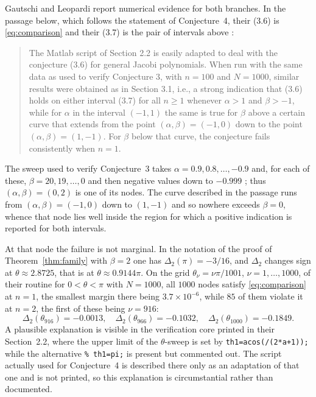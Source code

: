 \documentclass[11pt]{amsart}
\theoremstyle{remark}
\begin{document}
Gautschi and Leopardi report numerical evidence for both branches. In
the passage below, which follows the statement of Conjecture~4, their
(3.6) is \eqref{eq:comparison} and their (3.7) is the pair of intervals
above \cite[Section~3.2]{GautschiLeopardi}:
\begin{quote}
The Matlab script of Section 2.2 is easily adapted to deal with the
conjecture (3.6) for general Jacobi polynomials. When run with the
same data as used to verify Conjecture 3, with $n=100$ and $N=1000$,
similar results were obtained as in Section 3.1, i.e., a strong
indication that (3.6) holds on either interval (3.7) for all
$n\ge1$ whenever $\alpha>1$ and $\beta>-1$, while for $\alpha$ in the
interval $(-1,1)$ the same is true for $\beta$ above a certain curve
that extends from the point $(\alpha,\beta)=(-1,0)$ down to the point
$(\alpha,\beta)=(1,-1)$. For $\beta$ below that curve, the conjecture
fails consistently when $n=1$.
\end{quote}
The sweep used to verify Conjecture~3 takes
$\alpha=0.9,0.8,\dots,-0.9$ and, for each of these, $\beta=20,19,
\dots,0$ and then negative values down to $-0.999$
\cite[Section~3.1]{GautschiLeopardi}; thus $(\alpha,\beta)=(0,2)$ is
one of its nodes. The curve described in the passage runs from
$(\alpha,\beta)=(-1,0)$ down to $(1,-1)$ and so nowhere exceeds
$\beta=0$, whence that node lies well inside the region for which a positive
indication is reported for both intervals.

At that node the failure is not marginal. In the notation of the proof
of Theorem~\ref{thm:family} with $\beta=2$ one has
$\Delta_2(\pi)=-3/16$, and $\Delta_2$ changes sign at
$\theta\approx2.8725$, that is at $\theta\approx0.9144\pi$. On the
grid $\theta_\nu=\nu\pi/1001$, $\nu=1,\dots,1000$, of their routine
for $0<\theta<\pi$ with $N=1000$, all $1000$ nodes satisfy
\eqref{eq:comparison} at $n=1$, the smallest margin there being
$3.7\times10^{-6}$, while $85$ of them violate it at
$n=2$, the first of these being $\nu=916$:
\[
\Delta_2(\theta_{916})=-0.0013,\quad
\Delta_2(\theta_{966})=-0.1032,\quad
\Delta_2(\theta_{1000})=-0.1849.
\]
A plausible explanation is
visible in the verification core printed in their Section~2.2, where
the upper limit of the $\theta$-sweep is set by
\texttt{th1=\allowbreak acos(/\allowbreak(2*a+1));} while
the alternative
\texttt{\% th1=pi;} is present but commented out. The script actually
used for Conjecture~4 is described there only as an adaptation of that
one and is not printed, so this explanation is circumstantial rather
than documented.
\end{document}

